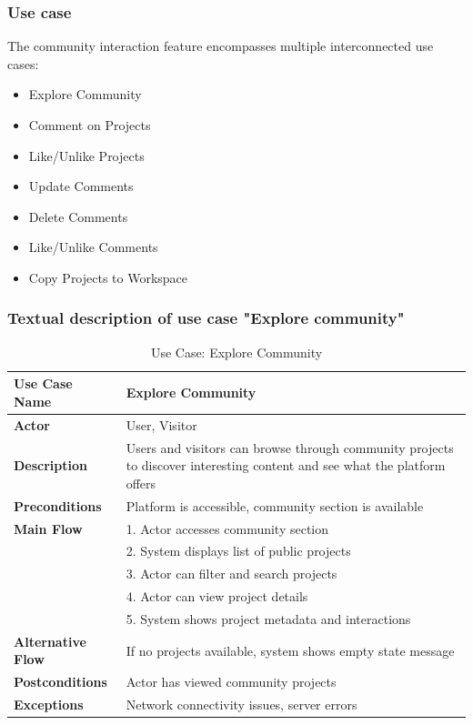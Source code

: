 \subsubsection{Use case}

The community interaction feature encompasses multiple interconnected use cases:

\begin{itemize}
\item Explore Community
\item Comment on Projects
\item Like/Unlike Projects
\item Update Comments
\item Delete Comments
\item Like/Unlike Comments
\item Copy Projects to Workspace
\end{itemize}

\subsubsection{Textual description of use case "Explore community"}

\begin{table}[H]
\centering
\caption{Use Case: Explore Community}
\begin{tabular}{|p{3cm}|p{10cm}|}
\hline
\textbf{Use Case Name} & Explore Community \\
\hline
\textbf{Actor} & User, Visitor \\
\hline
\textbf{Description} & Users and visitors can browse through community projects to discover interesting content and see what the platform offers \\
\hline
\textbf{Preconditions} & Platform is accessible, community section is available \\
\hline
\textbf{Main Flow} & 
1. Actor accesses community section \\
& 2. System displays list of public projects \\
& 3. Actor can filter and search projects \\
& 4. Actor can view project details \\
& 5. System shows project metadata and interactions \\
\hline
\textbf{Alternative Flow} & If no projects available, system shows empty state message \\
\hline
\textbf{Postconditions} & Actor has viewed community projects \\
\hline
\textbf{Exceptions} & Network connectivity issues, server errors \\
\hline
\end{tabular}
\end{table}

